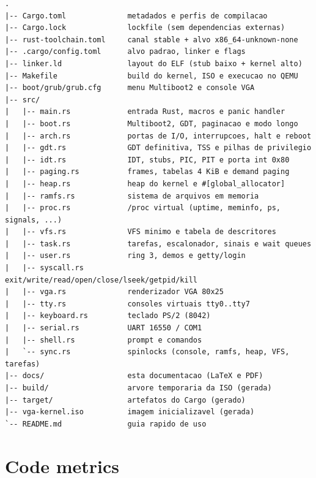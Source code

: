 \begin{lstlisting}[style=shell]
.
|-- Cargo.toml              metadados e perfis de compilacao
|-- Cargo.lock              lockfile (sem dependencias externas)
|-- rust-toolchain.toml     canal stable + alvo x86_64-unknown-none
|-- .cargo/config.toml      alvo padrao, linker e flags
|-- linker.ld               layout do ELF (stub baixo + kernel alto)
|-- Makefile                build do kernel, ISO e execucao no QEMU
|-- boot/grub/grub.cfg      menu Multiboot2 e console VGA
|-- src/
|   |-- main.rs             entrada Rust, macros e panic handler
|   |-- boot.rs             Multiboot2, GDT, paginacao e modo longo
|   |-- arch.rs             portas de I/O, interrupcoes, halt e reboot
|   |-- gdt.rs              GDT definitiva, TSS e pilhas de privilegio
|   |-- idt.rs              IDT, stubs, PIC, PIT e porta int 0x80
|   |-- paging.rs           frames, tabelas 4 KiB e demand paging
|   |-- heap.rs             heap do kernel e #[global_allocator]
|   |-- ramfs.rs            sistema de arquivos em memoria
|   |-- proc.rs             /proc virtual (uptime, meminfo, ps, signals, ...)
|   |-- vfs.rs              VFS minimo e tabela de descritores
|   |-- task.rs             tarefas, escalonador, sinais e wait queues
|   |-- user.rs             ring 3, demos e getty/login
|   |-- syscall.rs          exit/write/read/open/close/lseek/getpid/kill
|   |-- vga.rs              renderizador VGA 80x25
|   |-- tty.rs              consoles virtuais tty0..tty7
|   |-- keyboard.rs         teclado PS/2 (8042)
|   |-- serial.rs           UART 16550 / COM1
|   |-- shell.rs            prompt e comandos
|   `-- sync.rs             spinlocks (console, ramfs, heap, VFS, tarefas)
|-- docs/                   esta documentacao (LaTeX e PDF)
|-- build/                  arvore temporaria da ISO (gerada)
|-- target/                 artefatos do Cargo (gerado)
|-- vga-kernel.iso          imagem inicializavel (gerada)
`-- README.md               guia rapido de uso
\end{lstlisting}

\section{Code metrics}

